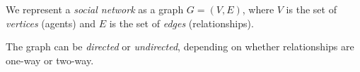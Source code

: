 \documentclass[
    preview, 
    varwidth = 11cm, 
    border = {0pt 0pt 1pt 1pt}
    ]{standalone} %
\begin{document}
\raggedright
We represent a \emph{social network} as a graph $G = (V, E)$, 
where $V$ is the set of \emph{vertices} (agents) and 
$E$ is the set of \emph{edges} (relationships).
\vspace{1em}

The graph can be \emph{directed} or \emph{undirected}, 
depending on whether relationships are one-way or two-way.
\end{document}
